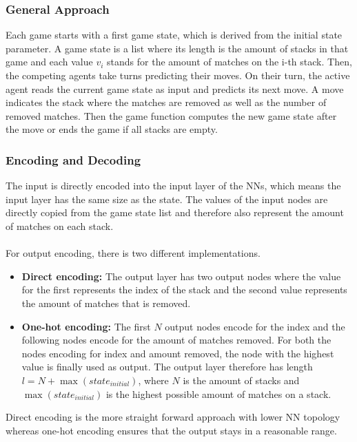 \subsubsection{General Approach}
Each game starts with a first game state, which is derived from the initial state parameter.
A game state is a list where its length is the amount of stacks in that game and each value $v_i$ stands for the amount of matches on the i-th stack.
Then, the competing agents take turns predicting their moves.
On their turn, the active agent reads the current game state as input and predicts its next move.
A move indicates the stack where the matches are removed as well as the number of removed matches.
Then the game function computes the new game state after the move or ends the game if all stacks are empty.

\subsubsection{Encoding and Decoding}
The input is directly encoded into the input layer of the NNs, which means the input layer has the same size as the state.
The values of the input nodes are directly copied from the game state list and therefore also represent the amount of matches on each stack.
\\ \\
For output encoding, there is two different implementations.
\begin{itemize}
    \item \textbf{Direct encoding:} The output layer has two output nodes where the value for the first represents the index of the stack and the second value represents the amount of matches that is removed.
    \item \textbf{One-hot encoding:} The first $N$ output nodes encode for the index and the following nodes encode for the amount of matches removed.
    For both the nodes encoding for index and amount removed, the node with the highest value is finally used as output.
    The output layer therefore has length $l = N + \max(state_{initial})$, where $N$ is the amount of stacks and $\max(state_{initial})$ is the highest possible amount of matches on a stack.
\end{itemize}
Direct encoding is the more straight forward approach with lower NN topology whereas one-hot encoding ensures that the output stays in a reasonable range.

